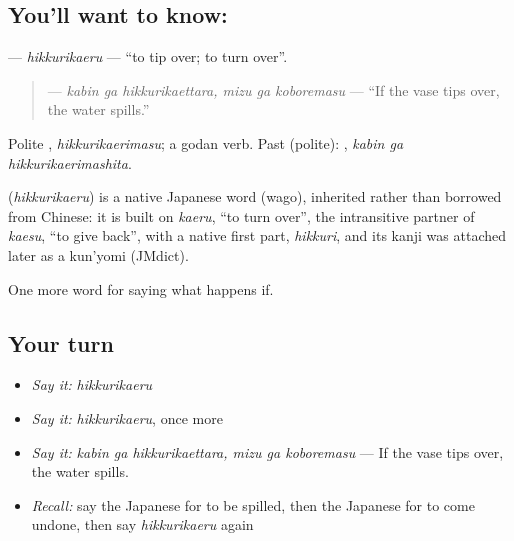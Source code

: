 \subsection*{You'll want to know: }
\textbf{} — \emph{hikkurikaeru} — \textquotedblleft{}to tip over; to turn over\textquotedblright{}.

\begin{quote}
\textbf{  } — \emph{kabin ga hikkurikaettara, mizu ga koboremasu} — \textquotedblleft{}If the vase tips over, the water spills.\textquotedblright{}
\end{quote}

Polite \textbf{}, \emph{hikkurikaerimasu}; a godan verb. Past (polite): \textbf{ }, \emph{kabin ga hikkurikaerimashita}.

\begin{cousinweb}
\textbf{} (\emph{hikkurikaeru}) is a native Japanese word (wago), inherited rather than borrowed from Chinese: it is built on \emph{kaeru}, \textquotedblleft{}to turn over\textquotedblright{}, the intransitive partner of \emph{kaesu}, \textquotedblleft{}to give back\textquotedblright{}, with a native first part, \emph{hikkuri}, and its kanji was attached later as a kun'yomi (JMdict).
\end{cousinweb}

\begin{grammarlens}[title={What you've built}]
One more word for saying what happens if.
\end{grammarlens}

\subsection*{Your turn}
\begin{itemize}
\raggedright
  \item \emph{Say it:} \emph{hikkurikaeru}
  \item \emph{Say it:} \emph{hikkurikaeru}, once more
  \item \emph{Say it:} \emph{kabin ga hikkurikaettara, mizu ga koboremasu} — If the vase tips over, the water spills.
  \item \emph{Recall:} say the Japanese for to be spilled, then the Japanese for to come undone, then say \emph{hikkurikaeru} again
\end{itemize}

